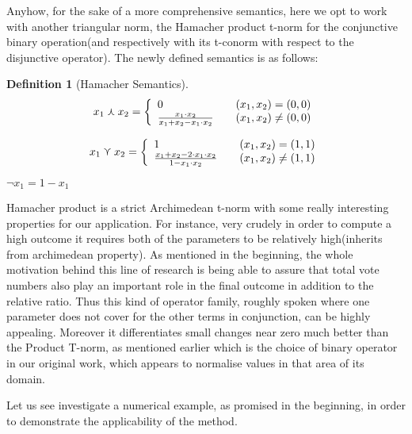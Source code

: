 \documentclass{article}
\newtheorem{definition}{Definition}
\begin{document}
Anyhow, for the sake of a more comprehensive semantics, here we opt to work with another triangular norm, the Hamacher product t-norm for the conjunctive binary operation(and respectively with its t-conorm with respect to the disjunctive operator). The newly defined semantics is as follows:

\begin{definition} [Hamacher Semantics]

\[  x_{1}\curlywedge x_{2}= \left\{ 
  \begin{array}{l l}
    0 & \quad ( x_{1},  x_{2}) = (0, 0)\\
    \frac{ x_{1}\cdot  x_{2}}{ x_{1}+ x_{2}- x_{1}\cdot  x_{2}} & \quad  ( x_{1},  x_{2}) \neq (0, 0)
  \end{array} \right.\]

\[  x_{1}\curlyvee x_{2}= \left\{ 
  \begin{array}{l l}
    1 & \quad ( x_{1},  x_{2}) = (1, 1)\\
    \frac{x_{1}+  x_{2} - 2 \cdot x_{1} \cdot x_{2}}{1- x_{1}\cdot  x_{2}} & \quad  ( x_{1},  x_{2}) \neq (1, 1)
  \end{array} \right.\]

\begin{center}
$\lnot x_{1}=1-x_{1}$
\end{center}
\end{definition}

Hamacher product is a strict Archimedean t-norm with some really interesting properties for our application. For instance, very crudely in order to compute a high outcome it requires both of the parameters to be relatively high(inherits from archimedean property). As mentioned in the beginning, the whole motivation behind this line of research is being able to assure that total vote numbers also play an important role in the final outcome in addition to the relative ratio. Thus this kind of operator family, roughly spoken where  one parameter does not cover for the other terms in conjunction,  can be highly appealing. Moreover it differentiates small changes near zero much better than the Product T-norm, as mentioned earlier which is the choice of binary operator in our original work, which appears to normalise values in that area of its domain.

Let us see investigate a numerical example, as promised in the beginning, in order to demonstrate the applicability of the method.
\end{document}
